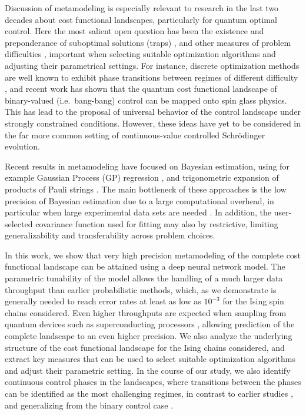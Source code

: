 \documentclass[aps, twocolumn,superscriptaddress]{revtex4-1}
\begin{document}
Discussion of metamodeling is especially relevant to research in the last two decades about cost functional landscapes, particularly for quantum optimal control. Here the most salient open question has been the existence and preponderance of suboptimal solutions (traps) \cite{rabitz2004quantum, pechen2011there, werschnik2007quantum, brif2010control, caneva2011chopped, Larocca_2018,bukov2018reinforcement}, and other measures of problem difficulties \cite{shen2006quantum, hsieh2009topology, nanduri2013exploring,Larocca_2018}, important when selecting suitable optimization algorithms and adjusting their parametrical settings. For instance, discrete optimization methods are well known to exhibit phase transitions between regimes of different difficulty \cite{smith1996locating,xu2000exact,gent1996tsp}, and recent work \cite{bukov2018reinforcement,day2019glassy} has shown that the quantum cost functional landscape of binary-valued (i.e.~bang-bang) control can be mapped onto spin glass physics. This has lead to the proposal of universal behavior of the control landscape under strongly constrained conditions. However, these ideas have yet to be considered in the far more common setting of continuous-value controlled Schrödinger evolution. 

Recent results in metamodeling have focused on Bayesian estimation, using for example Gaussian Process (GP) regression \cite{wigley2016fast,bentley2018gaussian, kokail2019self, sauvage2020optimal, paulson2020towards}, and trigonometric expansion of products of Pauli strings \cite{koczor2019quantum}. The main bottleneck of these approaches is the low precision of Bayesian estimation due to a large computational overhead, in particular when large experimental data sets are needed \cite{paulson2020towards}. In addition, the user-selected covariance function used for fitting may also by restrictive, limiting generalizability and transferability across problem choices. 

In this work, we show that very high precision metamodeling of the complete cost functional landscape can be attained using a deep neural network model. The parametric tunability of the model allows the handling of a much larger data throughput than earlier probabilistic methods, which, as we demonstrate is generally needed to reach error rates at least as low as $10^{-3}$ for the Ising spin chains considered. Even higher throughputs are expected when sampling from quantum devices such as superconducting processors \cite{walter2017rapid}, allowing prediction of the complete landscape to an even higher precision.  We also analyze the underlying structure of the cost functional landscape for the Ising chains considered, and extract key measures that can be used to select suitable optimization algorithms and adjust their parametric setting. In the course of our study, we also identify continuous control phases in the landscapes, where transitions between the phases can be identified as the most challenging regimes, in contrast to earlier studies \cite{tibbetts2012exploring, bukov2018reinforcement}, and generalizing from the binary control case \cite{bukov2018reinforcement,day2019glassy}. 
\end{document}
